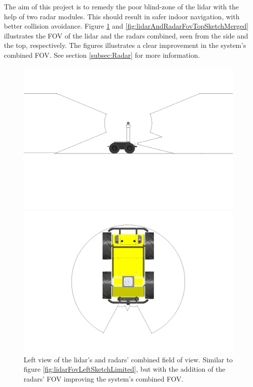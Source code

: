 The aim of this project is to remedy the poor blind-zone of the lidar with the help of two radar modules. This should result in safer indoor navigation, with better collision avoidance. Figure \ref{fig:lidarAndRadarFovLeftSketchMergedLimited} and \ref{fig:lidarAndRadarFovTopSketchMerged} illustrates the FOV of the lidar and the radars combined, seen from the side and the top, respectively. The figures illustrates a clear improvement in the system's combined FOV. See section \ref{subsec:Radar} for more information.

\begin{figure}[H]
    \centering
    \begin{minipage}[b]{0.49\textwidth}
        \includegraphics[width=\textwidth]{Figures/CAD/FOV/lidarAndRadarFovLeftSketchMergedLimited.PNG}
        \caption{Left view of the lidar's and radars' combined field of view. Similar to figure \ref{fig:lidarFovLeftSketchLimited}, but with the addition of the radars' FOV improving the system's combined FOV.}
        \label{fig:lidarAndRadarFovLeftSketchMergedLimited}
    \end{minipage}
    \begin{minipage}[b]{0.49\textwidth}
        \includegraphics[width=\textwidth]{Figures/CAD/FOV/lidarAndRadarFovTopSketchMerged.PNG}

\end{minipage}
\end{figure}
